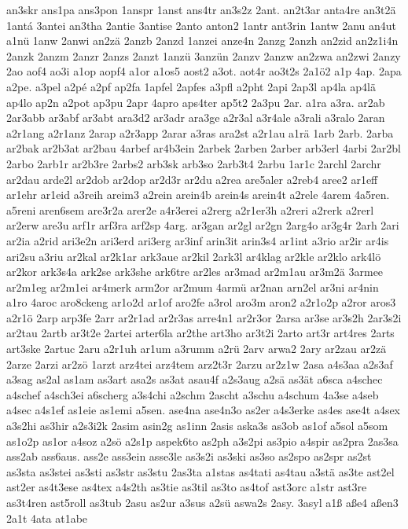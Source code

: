 {an3skr
ans1pa
ans3pon
1anspr
1anst
ans4tr
an3s2z
2ant.
an2t3ar
anta4re
an3t2ä
1antá
3antei
an3tha
2antie
3antise
2anto
anton2
1antr
ant3rin
1antw
2anu
an4ut
a1nü
1anw
2anwi
an2zä
2anzb
2anzd
1anzei
anze4n
2anzg
2anzh
an2zid
an2z1i4n
2anzk
2anzm
2anzr
2anzs
2anzt
1anzü
3anzün
2anzv
2anzw
an2zwa
an2zwi
2anzy
2ao
aof4
ao3i
a1op
aopf4
a1or
a1os5
aost2
a3ot.
aot4r
ao3t2s
2a1ö2
a1p
4ap.
2apa
a2pe.
a3pel
a2pé
a2pf
ap2fa
1apfel
2apfes
a3pfl
a2pht
2api
2ap3l
ap4la
ap4lä
ap4lo
ap2n
a2pot
ap3pu
2apr
4apro
aps4ter
ap5t2
2a3pu
2ar.
a1ra
a3ra.
ar2ab
2ar3abb
ar3abf
ar3abt
ara3d2
ar3adr
ara3ge
a2r3al
a3r4ale
a3rali
a3ralo
2aran
a2r1ang
a2r1anz
2arap
a2r3app
2arar
a3ras
ara2st
a2r1au
a1rä
1arb
2arb.
2arba
ar2bak
ar2b3at
ar2bau
4arbef
ar4b3ein
2arbek
2arben
2arber
arb3erl
4arbi
2ar2bl
2arbo
2arb1r
ar2b3re
2arbs2
arb3sk
arb3so
2arb3t4
2arbu
1ar1c
2archl
2archr
ar2dau
arde2l
ar2dob
ar2dop
ar2d3r
ar2du
a2rea
are5aler
a2reb4
aree2
ar1eff
ar1ehr
ar1eid
a3reih
areim3
a2rein
arein4b
arein4s
arein4t
a2rele
4arem
4a5ren.
a5reni
aren6sem
are3r2a
arer2e
a4r3erei
a2rerg
a2r1er3h
a2reri
a2rerk
a2rerl
ar2erw
are3u
arf1r
arf3ra
arf2sp
4arg.
ar3gan
ar2gl
ar2gn
2arg4o
ar3g4r
2arh
2ari
ar2ia
a2rid
ari3e2n
ari3erd
ari3erg
ar3inf
arin3it
arin3s4
ar1int
a3rio
ar2ir
ar4is
ari2su
a3riu
ar2kal
ar2k1ar
ark3aue
ar2kil
2ark3l
ar4klag
ar2kle
ar2klo
ark4lö
ar2kor
ark3s4a
ark2se
ark3she
ark6tre
ar2les
ar3mad
ar2m1au
ar3m2ä
3armee
ar2m1eg
ar2m1ei
ar4merk
arm2or
ar2mum
4armü
ar2nan
arn2el
ar3ni
ar4nin
a1ro
4aroc
aro8ckeng
ar1o2d
ar1of
aro2fe
a3rol
aro3m
aron2
a2r1o2p
a2ror
aros3
a2r1ö
2arp
arp3fe
2arr
ar2r1ad
ar2r3as
arre4n1
ar2r3or
2arsa
ar3se
ar3s2h
2ar3s2i
ar2tau
2artb
ar3t2e
2artei
arter6la
ar2the
art3ho
ar3t2i
2arto
art3r
art4res
2arts
art3ske
2artuc
2aru
a2r1uh
ar1um
a3rumm
a2rü
2arv
arwa2
2ary
ar2zau
ar2zä
2arze
2arzi
ar2zö
1arzt
arz4tei
arz4tem
arz2t3r
2arzu
ar2z1w
2asa
a4s3aa
a2s3af
a3sag
as2al
as1am
as3art
asa2s
as3at
asau4f
a2s3aug
a2sä
as3ät
a6sca
a4schec
a4schef
a4sch3ei
a6scherg
a3s4chi
a2schm
2ascht
a3schu
a4schum
4a3se
a4seb
a4sec
a4s1ef
as1eie
as1emi
a5sen.
ase4na
ase4n3o
as2er
a4s3erke
as4es
ase4t
a4sex
a3s2hi
as3hir
a2s3i2k
2asim
asin2g
as1inn
2asis
aska3s
as3ob
as1of
a5sol
a5som
as1o2p
as1or
a4soz
a2sö
a2s1p
aspek6to
as2ph
a3s2pi
as3pio
a4spir
as2pra
2as3sa
ass2ab
ass6aus.
ass2e
ass3ein
asse3le
as3s2i
as3ski
as3so
as2spo
as2spr
as2st
as3sta
as3stei
as3sti
as3str
as3stu
2as3ta
a1stas
as4tati
as4tau
a3stä
as3te
ast2el
ast2er
as4t3ese
as4tex
a4s2th
as3tie
as3til
as3to
as4tof
ast3orc
a1str
ast3re
as3t4ren
ast5roll
as3tub
2asu
as2ur
a3sus
a2sü
aswa2s
2asy.
3asyl
a1ß
aße4
aßen3
2a1t
4ata
at1abe
}
